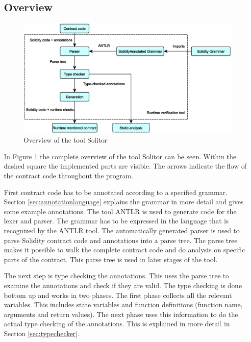 \documentclass[a4paper]{article}
\begin{document}
\subsection{Overview}
\begin{figure}
  \includegraphics[width=\textwidth,height=\textheight,keepaspectratio]{resources/ToolOverview.eps}
  \caption{Overview of the tool Solitor}
  \label{fig:view}
\end{figure}
In Figure \ref{fig:view} the complete overview of the tool Solitor can be seen. Within the dashed square the implemented parts are visible. The arrows indicate the flow of the contract code throughout the program. \par
First contract code has to be annotated according to a specified grammar. Section \ref{sec:annotationlanguage} explains the grammar in more detail and gives some example annotations. The tool ANTLR \cite{parr2013definitive} is used to generate code for the lexer and parser. The grammar has to be expressed in the language that is recognized by the ANTLR tool. The automatically generated parser is used to parse Solidity contract code and annotations into a parse tree. The parse tree makes it possible to walk the complete contract code and do analysis on specific parts of the contract. This parse tree is used in later stages of the tool. \par
The next step is type checking the annotations. This uses the parse tree to examine the annotations and check if they are valid. The type checking is done bottom up and works in two phases. The first phase collects all the relevant variables. This includes state variables and function definitions (function name, arguments and return values). The next phase uses this information to do the actual type checking of the annotations. This is explained in more detail in Section \ref{sec:typechecker}. \par
\end{document}
